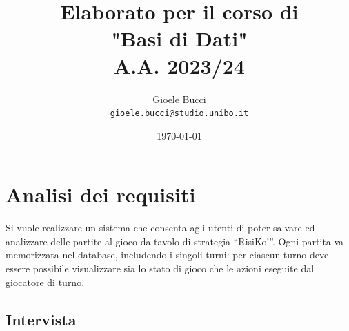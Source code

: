 \documentclass[a4paper,12pt]{report}
\title{\textbf{Elaborato per il corso di\\"Basi di Dati"}
\\A.A. 2023/24}
\author{Gioele Bucci
\\ \texttt{gioele.bucci@studio.unibo.it}}
\date{\today}
\begin{document}
\maketitle

\tableofcontents

\chapter{Analisi dei requisiti}

Si vuole realizzare un sistema che consenta agli utenti di poter salvare ed analizzare delle partite al gioco da tavolo di strategia “RisiKo!”.
Ogni partita va memorizzata nel database, includendo i singoli turni: per ciascun turno deve essere possibile visualizzare sia lo stato di gioco che le azioni eseguite dal giocatore di turno.

\section{Intervista}
\end{document}
